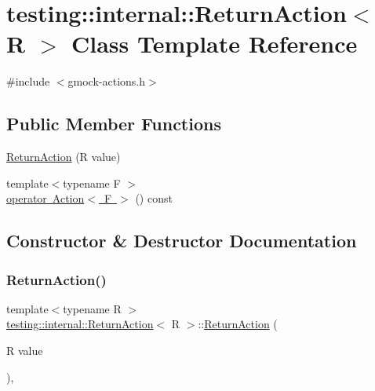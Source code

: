 \hypertarget{classtesting_1_1internal_1_1ReturnAction}{}\section{testing\+::internal\+::Return\+Action$<$ R $>$ Class Template Reference}
\label{classtesting_1_1internal_1_1ReturnAction}


{\ttfamily \#include $<$gmock-\/actions.\+h$>$}

\subsection*{Public Member Functions}
\begin{DoxyCompactItemize}
\item 
\mbox{\hyperlink{classtesting_1_1internal_1_1ReturnAction_af65344e503dae3ab36b4fd6d1ede6fb7}{Return\+Action}} (R value)
\item 
{\footnotesize template$<$typename F $>$ }\\\mbox{\hyperlink{classtesting_1_1internal_1_1ReturnAction_a1aab69c4ea104e76e70ba209763f61d5}{operator Action$<$ F $>$}} () const
\end{DoxyCompactItemize}


\subsection{Constructor \& Destructor Documentation}
\mbox{\label{classtesting_1_1internal_1_1ReturnAction_af65344e503dae3ab36b4fd6d1ede6fb7}} 
\subsubsection{\texorpdfstring{ReturnAction()}{ReturnAction()}}
{\footnotesize\ttfamily template$<$typename R $>$ \\
\mbox{\hyperlink{classtesting_1_1internal_1_1ReturnAction}{testing\+::internal\+::\+Return\+Action}}$<$ R $>$\+::\mbox{\hyperlink{classtesting_1_1internal_1_1ReturnAction}{Return\+Action}} (\begin{DoxyParamCaption}\item[{R}]{value }\end{DoxyParamCaption})\hspace{0.3cm}{\ttfamily [inline]}, {\ttfamily [explicit]}}



